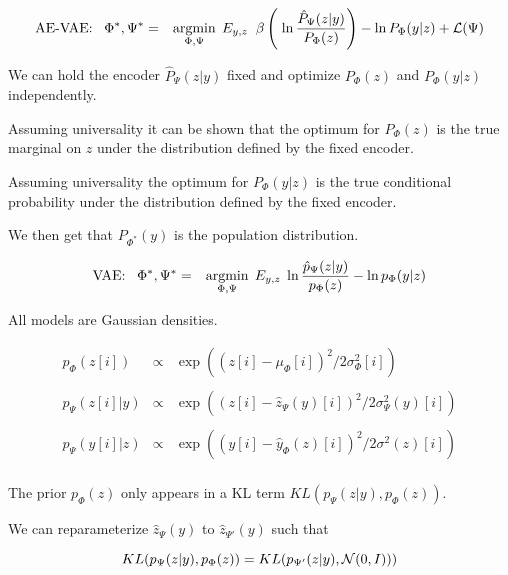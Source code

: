 {

{\huge
\begin{eqnarray*}
\mbox{AE-VAE:}\;\;\;\Phi^*,\Psi^* &  = & \operatorname*{argmin}_{\Phi,\Psi}\;E_{y,z} \;\; \beta\left(\;\ln \frac{\hat{P}_\Psi(z|y)}{P_\Phi(z)}\right)  - \ln P_\Phi(y|z) + {\cal L}(\Psi)
\end{eqnarray*}

\vfill
We can hold the encoder $\hat{P}_\Psi(z|y)$ fixed and optimize $P_\Phi(z)$ and $P_\Phi(y|z)$ independently.

\vfill
Assuming universality it can be shown that the optimum for $P_\Phi(z)$ is the true marginal on $z$ under the distribution defined by the fixed encoder.

\vfill
Assuming universality the optimum for $P_\Phi(y|z)$ is the true conditional probability under the distribution defined by the fixed encoder.

\vfill
We then get that $P_{\Phi^*}(y)$ is the population distribution.



\vfill
\begin{eqnarray*}
\mbox{VAE:}\;\;\;\Phi^*,\Psi^* &  = & \operatorname*{argmin}_{\Phi,\Psi}\;E_{y,z}  \;\ln \frac{\hat{p}_\Psi(z|y)}{p_\Phi(z)}  - \ln p_\Phi(y|z) \\
\end{eqnarray*}

\vfill
All models are Gaussian densities.

\vfill
{\huge 
\begin{eqnarray*}
p_\Phi(z[i]) & \propto & \exp((z[i]-\mu_\Phi[i])^2/2\sigma^2_\Phi[i])\\
\\
p_\Psi(z[i]|y) & \propto & \exp((z[i]-\hat{z}_\Psi(y)[i])^2/2\sigma^2_\Psi(y)[i])\\
\\
p_\Psi(y[i]|z) & \propto & \exp((y[i]-\hat{y}_\Phi(z)[i])^2/2\sigma^2(z)[i])\\
\end{eqnarray*}
}


The prior $p_\Phi(z)$ only appears in a KL term $KL(p_\Psi(z|y),p_\Phi(z))$.

\vfill
We can reparameterize $\hat{z}_\Psi(y)$ to $\hat{z}_{\Psi'}(y)$ such that

\vfill

$$KL(p_\Psi(z|y),p_{\Phi}(z)) = KL(p_{\Psi'}(z|y),{\cal N}(0,I)))$$

}}
